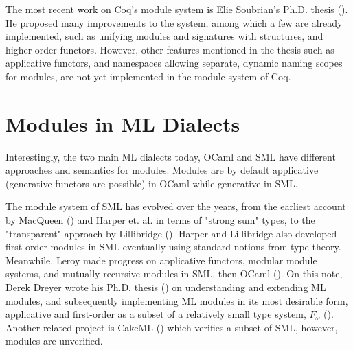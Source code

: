 The most recent work on Coq's module system is Elie Soubrian's Ph.D. thesis
(\cite{soubiran}). He proposed many improvements to the system, among which a
few are already implemented, such as unifying modules and signatures with
structures, and higher-order functors. However, other features mentioned in the
thesis such as applicative functors, and namespaces allowing separate, dynamic
naming scopes for modules, are not yet implemented in the module system of Coq.

\section{Modules in ML Dialects}
\label{sec:ml-dialects}
Interestingly, the two main ML dialects today, OCaml and SML have different
approaches and semantics for modules. Modules are by default applicative
(generative functors are possible) in OCaml while generative in SML.

The module system of SML has evolved over the years, from the earliest account
by MacQueen (\cite{macqueen1984modules}) and Harper et. al. in terms of "strong
sum" types, to the "transparent" approach by Lillibridge (\cite{harper1994type}).
Harper and Lillibridge also developed first-order modules in SML eventually
using standard notions from type theory. Meanwhile, Leroy made progress on
applicative functors, modular module systems, and mutually recursive modules in
SML, then OCaml (\cite{leroy1994manifest,leroy1995applicative,leroy2000modular}).
On this note, Derek Dreyer wrote his Ph.D. thesis (\cite{dreyerphd}) on
understanding and extending ML modules, and subsequently implementing ML modules
in its most desirable form, applicative and first-order as a subset of a
relatively small type system, $F_\omega$ (\cite{f-ing}). Another related project
is CakeML (\cite{cakeml}) which verifies a subset of SML, however, modules are
unverified.


